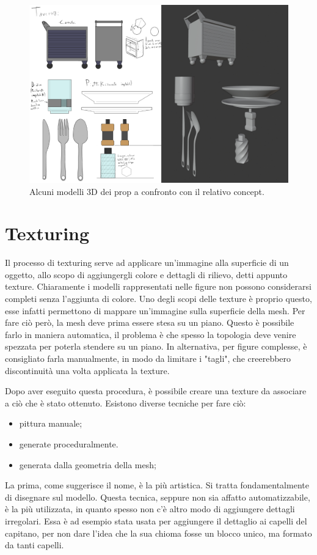 \begin{figure}
\centering
\includegraphics[width=.8\textwidth]{Figures/props}
\decoRule
\caption[Prop]{Alcuni modelli 3D dei prop a confronto con il relativo concept.}
\label{fig:prop}
\end{figure}

\newpage
\section{Texturing}

Il processo di texturing serve ad applicare un'immagine alla superficie di un oggetto, allo scopo di aggiungergli colore e dettagli di rilievo, detti appunto texture.  
Chiaramente i modelli rappresentati nelle figure non possono considerarsi completi senza l'aggiunta di colore.
Uno degli scopi delle texture è proprio questo, esse infatti permettono di mappare un'immagine sulla superficie della mesh.
Per fare ciò però, la mesh deve prima essere stesa su un piano. Questo è possibile farlo in maniera automatica, il problema è che spesso la topologia deve venire spezzata per poterla stendere su un piano.
In alternativa, per figure complesse, è consigliato farla manualmente, in modo da limitare i "tagli", che creerebbero discontinuità una volta applicata la texture.

Dopo aver eseguito questa procedura, è possibile creare una texture da associare a ciò che è stato ottenuto. Esistono diverse tecniche per fare ciò:
\begin{itemize}
    \item pittura manuale;
    \item generate proceduralmente.
    \item generata dalla geometria della mesh;
\end{itemize}
La prima, come suggerisce il nome, è la più artistica.
Si tratta fondamentalmente di disegnare sul modello.
Questa tecnica, seppure non sia affatto automatizzabile, è la più utilizzata, in quanto spesso non c'è altro modo di aggiungere dettagli irregolari. Essa è ad esempio stata usata per aggiungere il dettaglio ai capelli del capitano, per non dare l'idea che la sua chioma fosse un blocco unico, ma formato da tanti capelli.

